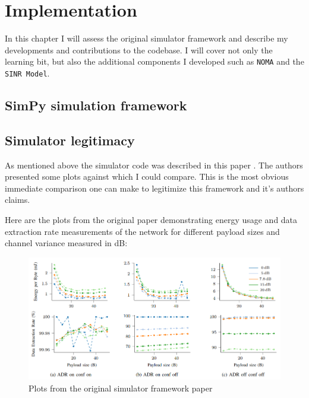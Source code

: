 

\chapter{Implementation}

In this chapter I will assess the original simulator framework \cite{simulator_github} and describe my developments and contributions to the codebase. 
I will cover not only the learning bit, but also the 
additional components I developed such as \texttt{NOMA} and the \texttt{SINR Model}. 

\section{SimPy simulation framework}

\section{Simulator legitimacy}
As mentioned above the simulator code was described in this 
paper \cite{simulator}. The authors presented some plots against
which I could compare. This is the most obvious immediate 
comparison one can make to legitimize this framework and it's
authors claims. 

Here are the plots from the original paper demonstrating 
energy usage and data extraction rate measurements of the
network for different payload sizes and channel variance 
measured in dB:

\begin{figure}[h]
\centering
\includegraphics[scale=0.6]{figures/original_plots.PNG}
  \caption{Plots from the original simulator framework paper \cite{simulator}}
  \label{fig:my_sectors}
\end{figure}

